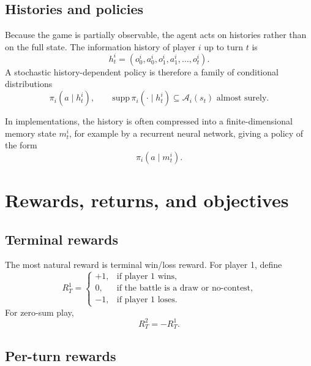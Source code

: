 \documentclass[aps,pre,twocolumn,superscriptaddress,nofootinbib]{revtex4-2}
\newcommand{\cA}{\mathcal{A}}
\theoremstyle{definition}
\theoremstyle{plain}
\begin{document}
\subsection{Histories and policies}

Because the game is partially observable, the agent acts on histories rather than on the full state. The information history of player $i$ up to turn $t$ is
\begin{equation}
    h_t^i = (o_0^i,a_0^i,o_1^i,a_1^i,\dots,o_t^i).
\end{equation}
A stochastic history-dependent policy is therefore a family of conditional distributions
\begin{equation}
    \pi_i(a\mid h_t^i),
    \qquad
    \mathrm{supp}\,\pi_i(\cdot\mid h_t^i) \subseteq \cA_i(s_t)
    \text{ almost surely.}
\end{equation}

In implementations, the history is often compressed into a finite-dimensional memory state $m_t^i$, for example by a recurrent neural network, giving a policy of the form
\begin{equation}
    \pi_i(a\mid m_t^i).
\end{equation}

\section{Rewards, returns, and objectives}
\label{sec:rewards}

\subsection{Terminal rewards}

The most natural reward is terminal win/loss reward. For player 1, define
\begin{equation}
    R_T^1 =
    \begin{cases}
        +1, & \text{if player 1 wins},                      \\
        0,  & \text{if the battle is a draw or no-contest}, \\
        -1, & \text{if player 1 loses}.
    \end{cases}
\end{equation}
For zero-sum play,
\begin{equation}
    R_T^2 = -R_T^1.
\end{equation}

\subsection{Per-turn rewards}
\end{document}
